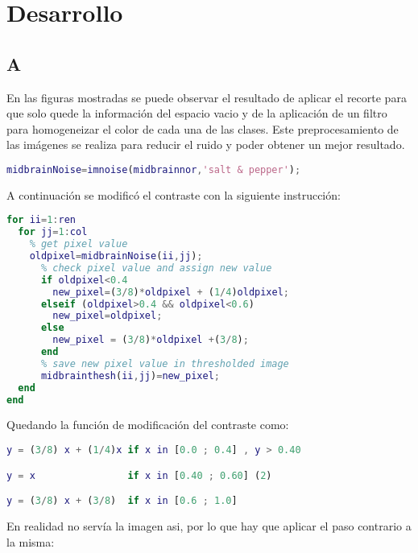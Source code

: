\documentclass[10pt,journal,compsoc]{IEEEtran}
\begin{document}
 
\hfill

\section{Desarrollo}

\subsection{A}

En las figuras mostradas se puede observar el resultado de aplicar el recorte para que solo quede la información del espacio vacio y de la aplicación  de un filtro para homogeneizar el color de cada una de las clases.
Este preprocesamiento de las imágenes se realiza para reducir el ruido y poder obtener un mejor resultado.

\begin{lstlisting}[language=Matlab,basicstyle=\small]
midbrainNoise=imnoise(midbrainnor,'salt & pepper');
\end{lstlisting}

A continuación se modificó el contraste con la siguiente instrucción:

\begin{lstlisting}[language=Matlab,basicstyle=\small]
for ii=1:ren
  for jj=1:col
    % get pixel value
    oldpixel=midbrainNoise(ii,jj);
      % check pixel value and assign new value
      if oldpixel<0.4
        new_pixel=(3/8)*oldpixel + (1/4)oldpixel;
      elseif (oldpixel>0.4 && oldpixel<0.6)
        new_pixel=oldpixel;
      else
        new_pixel = (3/8)*oldpixel +(3/8);
      end
      % save new pixel value in thresholded image
      midbrainthesh(ii,jj)=new_pixel;
  end
end
\end{lstlisting}

Quedando la función de modificación del contraste como:

\begin{lstlisting}[language=Matlab,basicstyle=\small]
y = (3/8) x + (1/4)x if x in [0.0 ; 0.4] , y > 0.40

y = x                if x in [0.40 ; 0.60] (2)

y = (3/8) x + (3/8)  if x in [0.6 ; 1.0]
\end{lstlisting}

En realidad no servía la imagen asi, por lo que hay que aplicar el paso contrario a la misma:
\end{document}
